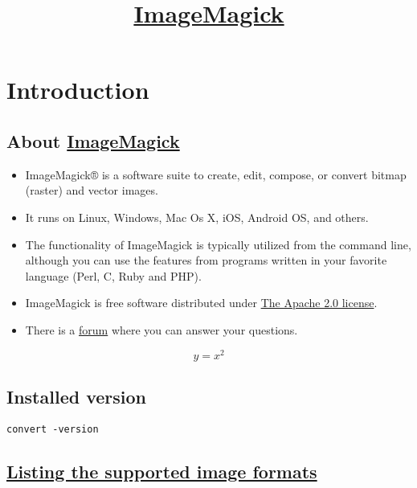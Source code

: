 \title{\href{http://www.imagemagick.org/}{ImageMagick}}

\maketitle
\tableofcontents

\chapter{Introduction}

\section{About \href{http://www.imagemagick.org/Usage/}{ImageMagick}}

\begin{itemize}
\item ImageMagick® is a software suite to create, edit, compose, or
  convert bitmap (raster) and vector images.
\item It runs on Linux, Windows, Mac Os X, iOS, Android OS, and
  others.
\item The functionality of ImageMagick is typically utilized from the
  command line, although you can use the features from programs
  written in your favorite language (Perl, C, Ruby and PHP).
\item ImageMagick is free software distributed under
  \href{http://www.apache.org/licenses/LICENSE-2.0.html}{The Apache
    2.0 license}.
\item There is a
  \href{http://www.imagemagick.org/discourse-server/}{forum} where you
  can answer your questions.
\end{itemize}


\begin{equation}
y=x^2
\end{equation}

\section{Installed version}

\begin{lstlisting}
convert -version
\end{lstlisting}


\section{\href{http://www.imagemagick.org/script/formats.php}{Listing the supported image formats}}

